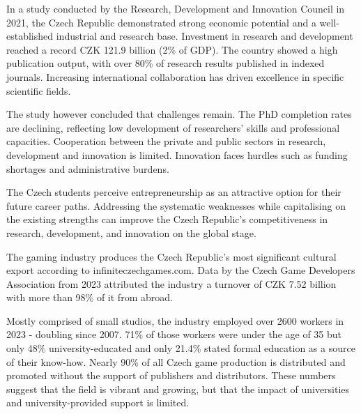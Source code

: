 In a study conducted by the Research, Development and Innovation Council in 2021, the Czech Republic demonstrated strong economic potential and a well-established industrial and research base. Investment in research and development reached a record CZK 121.9 billion (2\% of GDP). The country showed a high publication output, with over 80\% of research results published in indexed journals. Increasing international collaboration has driven excellence in specific scientific fields.

The study however concluded that challenges remain. The PhD completion rates are declining, reflecting low development of researchers' skills and professional capacities. Cooperation between the private and public sectors in research, development and innovation is limited. Innovation faces hurdles such as funding shortages and administrative burdens.

The Czech students perceive entrepreneurship as an attractive option for their future career paths. Addressing the systematic weaknesses while capitalising on the existing strengths can improve the Czech Republic’s competitiveness in research, development, and innovation on the global stage.

The gaming industry produces the Czech Republic’s most significant cultural export according to infiniteczechgames.com. Data by the Czech Game Developers Association from 2023 attributed the industry a turnover of CZK 7.52 billion with more than 98\% of it from abroad.

Mostly comprised of small studios, the industry employed over 2600 workers in 2023 - doubling since 2007. 71\% of those workers were under the age of 35 but only 48\% university-educated and only 21.4\% stated formal education as a source of their know-how. Nearly 90\% of all Czech game production is distributed and promoted without the support of publishers and distributors. These numbers suggest that the field is vibrant and growing, but that the impact of universities and university-provided support is limited.
